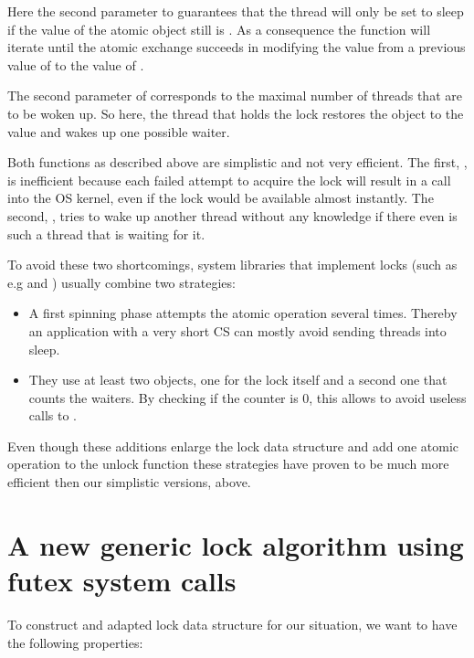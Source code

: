 Here the second parameter to  guarantees that the thread
will only be set to sleep if the value of the atomic object 
still is . As a consequence the  function will iterate until the
atomic exchange succeeds in modifying the value from a previous
value of  to the value of .

The second parameter of  corresponds to the maximal
number of threads that are to be woken up. So here, the thread that
holds the lock restores the object  to the value  and wakes
up one possible waiter.

Both functions as described above are simplistic and not very
efficient. The first, , is inefficient because each failed
attempt to acquire the lock will result in a call into the OS
kernel, even if the lock would be available almost instantly.  The
second, , tries to wake up another thread without any
knowledge if there even is such a thread that is waiting for it.

To avoid these two shortcomings, system libraries that implement
locks (such as e.g  and ) usually combine two
strategies:\itemadjust

\begin{itemize}
\item A first spinning phase attempts the atomic operation several
times. Thereby an application with a very short CS can mostly
avoid sending threads into sleep.\itemadjust

\item They use at least two  objects, one for the lock itself
and a second one that counts the waiters. By checking if the
counter is 0, this allows to avoid useless calls to
.\itemadjust
\end{itemize}

Even though these additions enlarge the lock data structure and add
one atomic operation to the unlock function these strategies have
proven to be much more efficient then our simplistic versions,
above.

\section{A new generic lock algorithm using futex system calls}
\label{sec-3}

To construct and adapted lock data structure for our situation, we
want to have the following properties:

